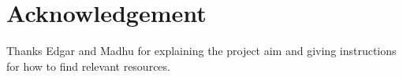 \section*{Acknowledgement}
Thanks Edgar and Madhu for explaining the project aim and giving instructions for how to find relevant resources.